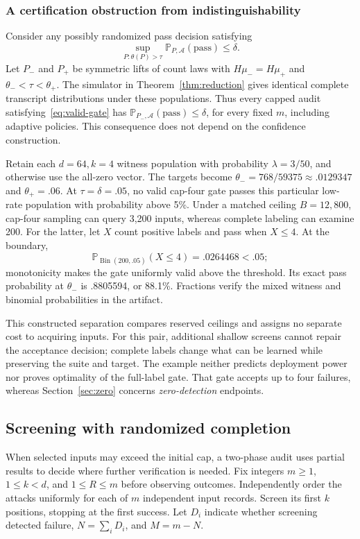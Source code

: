 \documentclass[conference]{IEEEtran}
\newcommand{\Prob}{\mathbb{P}}
\DeclareMathOperator{\Bin}{Bin}
\begin{document}
\subsubsection{A certification obstruction from indistinguishability}\label{sec:gate-obstruction}
Consider any possibly randomized pass decision satisfying
\begin{equation}\label{eq:valid-gate}
 \sup_{P:\theta(P)>\tau}\Prob_{P,\mathcal A}(\mathrm{pass})\leq\delta.
\end{equation}
Let $P_-$ and $P_+$ be symmetric lifts of count laws with $H\mu_-=H\mu_+$ and $\theta_-<\tau<\theta_+$. The simulator in Theorem~\ref{thm:reduction} gives identical complete transcript distributions under these populations. Thus every capped audit satisfying~\eqref{eq:valid-gate} has $\Prob_{P_-,\mathcal A}(\mathrm{pass})\leq\delta$, for every fixed $m$, including adaptive policies. This consequence does not depend on the confidence construction.

Retain each $d=64,k=4$ witness population with probability $\lambda=3/50$, and otherwise use the all-zero vector. The targets become $\theta_-=768/59375\approx.0129347$ and $\theta_+=.06$. At $\tau=\delta=.05$, no valid cap-four gate passes this particular low-rate population with probability above 5\%. Under a matched ceiling $B=12{,}800$, cap-four sampling can query 3,200 inputs, whereas complete labeling can examine 200. For the latter, let $X$ count positive labels and pass when $X\leq4$. At the boundary,
\[
 \Prob_{\Bin(200,.05)}(X\leq4)=.0264468<.05;
\]
monotonicity makes the gate uniformly valid above the threshold. Its exact pass probability at $\theta_-$ is .8805594, or 88.1\%. Fractions verify the mixed witness and binomial probabilities in the artifact.

This constructed separation compares reserved ceilings and assigns no separate cost to acquiring inputs. For this pair, additional shallow screens cannot repair the acceptance decision; complete labels change what can be learned while preserving the suite and target. The example neither predicts deployment power nor proves optimality of the full-label gate. That gate accepts up to four failures, whereas Section~\ref{sec:zero} concerns \emph{zero-detection} endpoints.

\subsection{Screening with randomized completion}\label{sec:completion}
When selected inputs may exceed the initial cap, a two-phase audit uses partial results to decide where further verification is needed. Fix integers $m\geq1$, $1\leq k<d$, and $1\leq R\leq m$ before observing outcomes. Independently order the attacks uniformly for each of $m$ independent input records. Screen its first $k$ positions, stopping at the first success. Let $D_i$ indicate whether screening detected failure, $N=\sum_iD_i$, and $M=m-N$.
\end{document}
